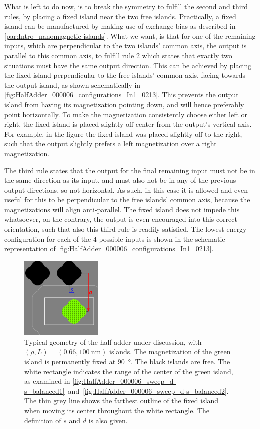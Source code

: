 \documentclass[11pt,a4paper,english,twoside]{article}
\begin{document}
What is left to do now, is to break the symmetry to fulfill the second and third rules, by placing a fixed island near the two free islands. Practically, a fixed island can be manufactured by making use of exchange bias as described in \cref{par:Intro_nanomagnetic-islands}. What we want, is that for one of the remaining inputs, which are perpendicular to the two islands' common axis, the output is parallel to this common axis, to fulfill rule 2 which states that exactly two situations must have the same output direction. This can be achieved by placing the fixed island perpendicular to the free islands' common axis, facing towards the output island, as shown schematically in \cref{fig:HalfAdder_000006_configurations_In1_0213}. This prevents the output island from having its magnetization pointing down, and will hence preferably point horizontally. To make the magnetization consistently choose either left or right, the fixed island is placed slightly off-center from the output's vertical axis. For example, in the figure the fixed island was placed slightly off to the right, such that the output slightly prefers a left magnetization over a right magnetization. \par
The third rule states that the output for the final remaining input must not be in the same direction as its input, and must also not be in any of the previous output directions, so not horizontal. As such, in this case it is allowed and even useful for this to be perpendicular to the free islands' common axis, because the magnetizations will align anti-parallel. The fixed island does not impede this whatsoever, on the contrary, the output is even encouraged into this correct orientation, such that also this third rule is readily satisfied. The lowest energy configuration for each of the 4 possible inputs is shown in the schematic representation of \cref{fig:HalfAdder_000006_configurations_In1_0213}.

\begin{figure}[t!]
    \centering
    \includegraphics[width=0.35\textwidth]{Figures/half_adder/regions000006.pdf}
    \caption{Typical geometry of the half adder under discussion, with $(\rho, L) = (0.66, \SI{100}{\nano\metre})$ islands. The magnetization of the green island is permanently fixed at \SI{90}{\degree}. The black islands are free. The white rectangle indicates the range of the center of the green island, as examined in \cref{fig:HalfAdder_000006_sweep_d-s_balanced1}~and~\ref{fig:HalfAdder_000006_sweep_d-s_balanced2}. The thin grey line shows the farthest outline of the fixed island when moving its center throughout the white rectangle. The definition of $s$ and $d$ is also given.}
    \label{fig:HalfAdder_000006_geometryTypical}
\end{figure}
\end{document}
